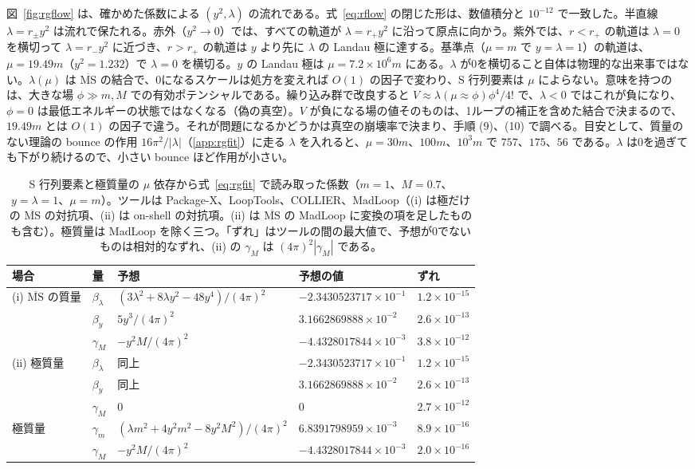 \documentclass[a4paper,10pt]{ltjsarticle}
\newcommand{\MSbar}{\overline{\mathrm{MS}}}
\begin{document}
図~\ref{fig:rgflow} は、確かめた係数による $(y^2,\lambda)$ の流れである。式~\eqref{eq:rflow} の閉じた形は、数値積分と $10^{-12}$ で一致した。半直線 $\lambda=r_\pm y^2$ は流れで保たれる。赤外（$y^2\to0$）では、すべての軌道が $\lambda=r_+y^2$ に沿って原点に向かう。紫外では、$r<r_+$ の軌道は $\lambda=0$ を横切って $\lambda=r_-y^2$ に近づき、$r>r_+$ の軌道は $y$ より先に $\lambda$ の Landau 極に達する。基準点（$\mu=m$ で $y=\lambda=1$）の軌道は、$\mu=19.49m$（$y^2=1.232$）で $\lambda=0$ を横切る。$y$ の Landau 極は $\mu=7.2\times10^6m$ にある。$\lambda$ が0を横切ること自体は物理的な出来事ではない。$\lambda(\mu)$ は $\MSbar$ の結合で、0になるスケールは処方を変えれば $O(1)$ の因子で変わり、S 行列要素は $\mu$ によらない。意味を持つのは、大きな場 $\phi\gg m,M$ での有効ポテンシャルである。繰り込み群で改良すると $V\approx\lambda(\mu\approx\phi)\phi^4/4!$ で、$\lambda<0$ ではこれが負になり、$\phi=0$ は最低エネルギーの状態ではなくなる（偽の真空）。$V$ が負になる場の値そのものは、1ループの補正を含めた結合で決まるので、$19.49m$ とは $O(1)$ の因子で違う。それが問題になるかどうかは真空の崩壊率で決まり、手順 (9)、(10) で調べる。目安として、質量のない理論の bounce の作用 $16\pi^2/|\lambda|$（\ref{app:rgfit}）に走る $\lambda$ を入れると、$\mu=30m$、$100m$、$10^3m$ で $757$、$175$、$56$ である。$\lambda$ は0を過ぎても下がり続けるので、小さい bounce ほど作用が小さい。

\begin{table}[tbp]
\centering\small
\caption{S 行列要素と極質量の $\mu$ 依存から式~\eqref{eq:rgfit} で読み取った係数（$m=1$、$M=0.7$、$y=\lambda=1$、$\mu=m$）。ツールは Package-X、LoopTools、COLLIER、MadLoop（(i) は極だけの $\MSbar$ の対抗項、(ii) は on-shell の対抗項。(ii) は $\MSbar$ の MadLoop に変換の項を足したものも含む）。極質量は MadLoop を除く三つ。「ずれ」はツールの間の最大値で、予想が0でないものは相対的なずれ、(ii) の $\gamma_M$ は $(4\pi)^2|\gamma_M|$ である。}
\label{tab:rg}
\setlength{\tabcolsep}{4pt}
\begin{tabular}{lllll}
\toprule
場合 & 量 & 予想 & 予想の値 & ずれ \\
\midrule
(i) $\MSbar$ の質量 & $\beta_\lambda$ & $(3\lambda^2+8\lambda y^2-48y^4)/(4\pi)^2$ & $-2.3430523717\times10^{-1}$ & $1.2\times10^{-15}$ \\
 & $\beta_y$ & $5y^3/(4\pi)^2$ & $3.1662869888\times10^{-2}$ & $2.6\times10^{-13}$ \\
 & $\gamma_M$ & $-y^2M/(4\pi)^2$ & $-4.4328017844\times10^{-3}$ & $3.8\times10^{-12}$ \\
(ii) 極質量 & $\beta_\lambda$ & 同上 & $-2.3430523717\times10^{-1}$ & $1.2\times10^{-15}$ \\
 & $\beta_y$ & 同上 & $3.1662869888\times10^{-2}$ & $2.6\times10^{-13}$ \\
 & $\gamma_M$ & $0$ & $0$ & $2.7\times10^{-12}$ \\
極質量 & $\gamma_m$ & $(\lambda m^2+4y^2m^2-8y^2M^2)/(4\pi)^2$ & $6.8391798959\times10^{-3}$ & $8.9\times10^{-16}$ \\
 & $\gamma_M$ & $-y^2M/(4\pi)^2$ & $-4.4328017844\times10^{-3}$ & $2.0\times10^{-16}$ \\
\bottomrule
\end{tabular}
\end{table}
\end{document}
